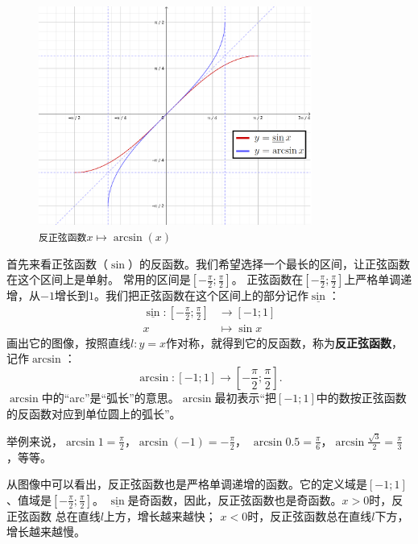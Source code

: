 \documentclass[12pt,UTF8]{ctexbook}
\begin{document}
\begin{figure}[h] %
    \vspace{4pt}
    \centering
    \includegraphics[width=0.8\textwidth]{tu/反正弦函数1.png}
    \caption*{\texttt{反正弦函数}$x\mapsto \arcsin(x)$}
\end{figure}

首先来看正弦函数（$\sin$）的反函数。我们希望选择一个最长的区间，让正弦函数在这个区间上是单射。
常用的区间是$[-\frac{\pi}{2}; \frac{\pi}{2}]$。
正弦函数在$[-\frac{\pi}{2}; \frac{\pi}{2}]$上严格单调递增，从$-1$增长到$1$。我们把正弦函数在这个区间上的部分记作$\underline{\sin}$：
\begin{align*}
     \underline{\sin} : [-\frac{\pi}{2}; \frac{\pi}{2}] &\rightarrow [-1; 1] \\
                                                           x &\mapsto \sin{x} 
\end{align*}
画出它的图像，按照直线$l: y = x$作对称，就得到它的反函数，称为\textbf{反正弦函数}，记作$\arcsin$：
$$ \arcsin : [-1; 1] \rightarrow [-\frac{\pi}{2}; \frac{\pi}{2}] . $$
$\arcsin$中的“arc”是“弧长”的意思。$\arcsin$最初表示“把$[-1; 1]$中的数按正弦函数的反函数对应到单位圆上的弧长”。

举例来说，$\arcsin{1} = \frac{\pi}{2}$，$\arcsin{(-1)} = -\frac{\pi}{2}$，
$\arcsin{0.5} = \frac{\pi}{6}$，$\arcsin{\frac{\sqrt{3}}{2}} = \frac{\pi}{3}$，等等。

从图像中可以看出，反正弦函数也是严格单调递增的函数。它的定义域是$[-1; 1]$、值域是$[-\frac{\pi}{2}; \frac{\pi}{2}]$。
$\underline{\sin}$是奇函数，因此，反正弦函数也是奇函数。$x > 0$时，反正弦函数
总在直线$l$上方，增长越来越快；
$x < 0$时，反正弦函数总在直线$l$下方，增长越来越慢。
\end{document}
